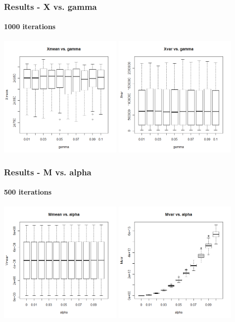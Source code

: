 \begin{frame}
    \frametitle{Results - X vs. gamma }
	\framesubtitle{1000 iterations}
\hspace*{-5mm}
\includegraphics[height=6cm]{boxplot1000_xmean_gamma}
\includegraphics[height=6cm]{boxplot1000_xvar_gamma}
\end{frame}





\begin{frame}
    \frametitle{Results - M vs. alpha }
	\framesubtitle{500 iterations}
\hspace*{-5mm}
\includegraphics[height=6cm]{boxplot500_mmean_alpha}
\includegraphics[height=6cm]{boxplot500_mvar_alpha}
\end{frame}

